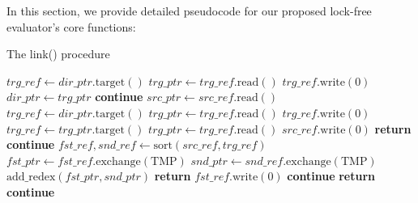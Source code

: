 \documentclass{article}
\begin{document}
In this section, we provide detailed pseudocode for our proposed lock-free evaluator's core functions:

\begin{algorithm}
\caption{The link() procedure}\label{alg:link}
\begin{algorithmic}[1]
    \State $trg\_ref \gets dir\_ptr.\text{target}()$
    \State $trg\_ptr \gets trg\_ref.\text{read}()$
      \State $trg\_ref.\text{write}(0)$
      \State $dir\_ptr \gets trg\_ptr$
      \State \textbf{continue}
      \State $src\_ptr \gets src\_ref.\text{read}()$
        \State $trg\_ref \gets dir\_ptr.\text{target}()$
        \State $trg\_ptr \gets trg\_ref.\text{read}()$
          \State $trg\_ref.\text{write}(0)$
          \State $trg\_ref \gets trg\_ptr.\text{target}()$
          \State $trg\_ptr \gets trg\_ref.\text{read}()$
        \EndWhile
        \State $src\_ref.\text{write}(0)$
        \State \textbf{return}
      \Else
        \State \textbf{continue}
      \EndIf
      \State $fst\_ref, snd\_ref \gets \text{sort}(src\_ref, trg\_ref)$
      \State $fst\_ptr \gets fst\_ref.\text{exchange}(\text{TMP})$
        \State $snd\_ptr \gets snd\_ref.\text{exchange}(\text{TMP})$
        \State $\text{add\_redex}(fst\_ptr, snd\_ptr)$
        \State \textbf{return}
      \Else
        \State $fst\_ref.\text{write}(0)$
          \State \textbf{continue}
        \EndWhile
        \State \textbf{return}
      \EndIf
    \Else
      \State \textbf{continue}
    \EndIf
  \EndWhile
\EndProcedure
\end{algorithmic}
\end{algorithm}
\end{document}
